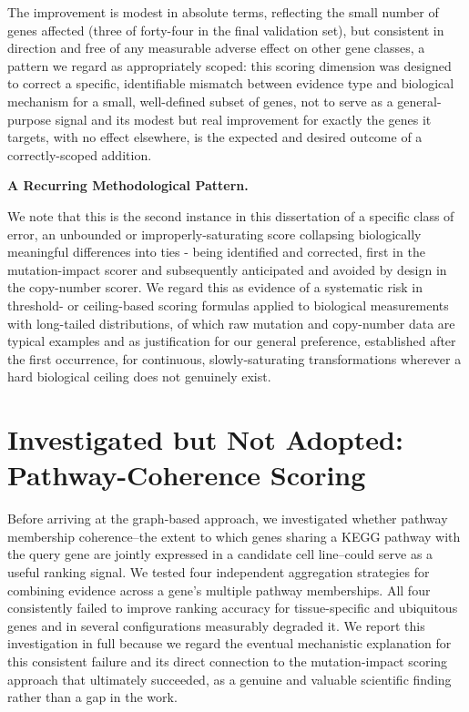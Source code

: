 \documentclass[author={Karen Coutinho, Ishaan Bhalla, Aman Raj, Dixit Kaloorani Malarmannan},
                supervisor={Dr. Daniel D'Andrea},
                degree={MSc},
                title={CellSelector Omics: A Multi-Omics Recommendation System for Cell Line Selection},
                subtitle={},
                type={},
                year={2026}]{dissertation}
\begin{document}
The improvement is modest in absolute terms, reflecting the small number of genes affected (three of forty-four in the final validation set), but consistent in direction and free of any measurable adverse effect on other gene classes, a pattern we regard as appropriately scoped: this scoring dimension was designed to correct a specific, identifiable mismatch between evidence type and biological mechanism for a small, well-defined subset of genes, not to serve as a general-purpose signal and its modest but real improvement for exactly the genes it targets, with no effect elsewhere, is the expected and desired outcome of a correctly-scoped addition.

{\bf A Recurring Methodological Pattern.}

We note that this is the second instance in this dissertation of a specific class of error, an unbounded or improperly-saturating score collapsing biologically meaningful differences into ties - being identified and corrected, first in the mutation-impact scorer and subsequently anticipated and avoided by design in the copy-number scorer. We regard this as evidence of a systematic risk in threshold- or ceiling-based scoring formulas applied to biological measurements with long-tailed distributions, of which raw mutation and copy-number data are typical examples and as justification for our general preference, established after the first occurrence, for continuous, slowly-saturating transformations wherever a hard biological ceiling does not genuinely exist.


\section{Investigated but Not Adopted: Pathway-Coherence Scoring}

Before arriving at the graph-based approach, we investigated whether pathway membership coherence--the extent to which genes sharing a KEGG pathway with the query gene are jointly expressed in a candidate cell line--could serve as a useful ranking signal. We tested four independent aggregation strategies for combining evidence across a gene's multiple pathway memberships. All four consistently failed to improve ranking accuracy for tissue-specific and ubiquitous genes and in several configurations measurably degraded it. We report this investigation in full because we regard the eventual mechanistic explanation for this consistent failure and its direct connection to the mutation-impact scoring approach that ultimately succeeded, as a genuine and valuable scientific finding rather than a gap in the work.
\end{document}
